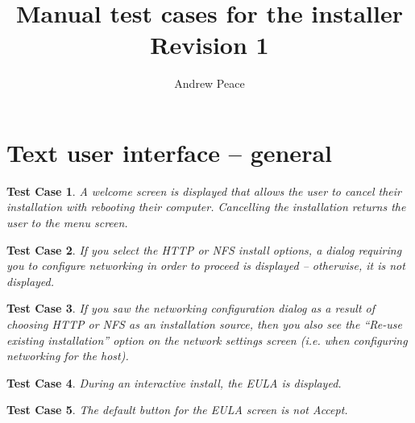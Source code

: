 \documentclass[a4paper]{article}
\newtheorem{testcase}{Test Case}
\begin{document}
\title{Manual test cases for the installer \\  Revision 1}
\author{Andrew Peace}
\date{}

\maketitle

\section{Text user interface -- general}

\begin{testcase}
A welcome screen is displayed that allows the user to cancel their
installation with rebooting their computer.  Cancelling the
installation returns the user to the menu screen.
\end{testcase}

\begin{testcase}
If you select the HTTP or NFS install options, a dialog requiring you
to configure networking in order to proceed is displayed -- otherwise,
it is not displayed.
\end{testcase}

\begin{testcase}
If you saw the networking configuration dialog as a result of choosing
HTTP or NFS as an installation source, then you also see the ``Re-use
existing installation'' option on the network settings screen
(i.e. when configuring networking for the host).
\end{testcase}

\begin{testcase}
During an interactive install, the EULA is displayed.
\end{testcase}

\begin{testcase}
The default button for the EULA screen is not Accept.
\end{testcase}
\end{document}
